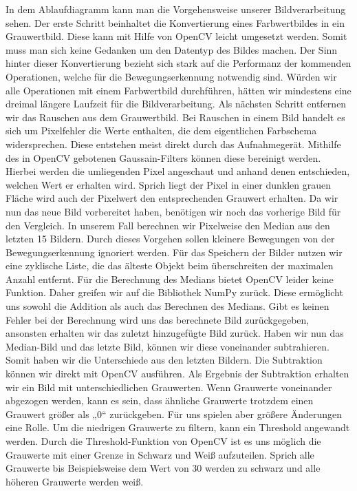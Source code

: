 In dem Ablaufdiagramm kann man die Vorgehensweise unserer Bildverarbeitung sehen. Der erste Schritt beinhaltet die Konvertierung eines Farbwertbildes in ein Grauwertbild. Diese kann mit Hilfe von OpenCV leicht umgesetzt werden. Somit muss man sich keine Gedanken um den Datentyp des Bildes machen. Der Sinn hinter dieser Konvertierung bezieht sich stark auf die Performanz der kommenden Operationen, welche für die Bewegungserkennung notwendig sind. Würden wir alle Operationen mit einem Farbwertbild durchführen, hätten wir mindestens eine dreimal längere Laufzeit für die Bildverarbeitung.
Als nächsten Schritt entfernen wir das Rauschen aus dem Grauwertbild. Bei Rauschen in einem Bild handelt es sich um Pixelfehler die Werte enthalten, die dem eigentlichen Farbschema widersprechen. Diese entstehen meist direkt durch das Aufnahmegerät. Mithilfe des in OpenCV gebotenen Gaussain-Filters können diese bereinigt werden. Hierbei werden die umliegenden Pixel angeschaut und anhand denen entschieden, welchen Wert er erhalten wird. Sprich liegt der Pixel in einer dunklen grauen Fläche wird auch der Pixelwert den entsprechenden Grauwert erhalten.
Da wir nun das neue Bild vorbereitet haben, benötigen wir noch das vorherige Bild für den Vergleich. In unserem Fall berechnen wir Pixelweise den Median aus den letzten 15 Bildern. Durch dieses Vorgehen sollen kleinere Bewegungen von der Bewegungserkennung ignoriert werden. Für das Speichern der Bilder nutzen wir eine zyklische Liste, die das älteste Objekt beim überschreiten der maximalen Anzahl entfernt. Für die Berechnung des Medians bietet OpenCV leider keine Funktion. Daher greifen wir auf die Bibliothek NumPy zurück. Diese ermöglicht uns sowohl die Addition als auch das Berechnen des Medians. Gibt es keinen Fehler bei der Berechnung wird uns das berechnete Bild zurückgegeben, ansonsten erhalten wir das zuletzt hinzugefügte Bild zurück.
Haben wir nun das Median-Bild und das letzte Bild, können wir diese voneinander subtrahieren. Somit haben wir die Unterschiede aus den letzten Bildern. Die Subtraktion können wir direkt mit OpenCV ausführen.
Als Ergebnis der Subtraktion erhalten wir ein Bild mit unterschiedlichen Grauwerten. Wenn Grauwerte voneinander abgezogen werden, kann es sein, dass ähnliche Grauwerte trotzdem einen Grauwert größer als „0“ zurückgeben. Für uns spielen aber größere Änderungen eine Rolle. Um die niedrigen Grauwerte zu filtern, kann ein Threshold angewandt werden. Durch die Threshold-Funktion von OpenCV ist es uns möglich die Grauwerte mit einer Grenze in Schwarz und Weiß aufzuteilen.  Sprich alle Grauwerte  bis Beispielsweise dem Wert von 30 werden zu schwarz und alle höheren Grauwerte werden weiß.
